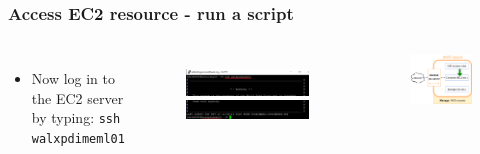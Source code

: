\documentclass[aspectratio=169]{beamer} %
\newcommand{\ectwoName}{walxpdimeml01}
\begin{document}
\begin{frame}
	\frametitle{Access EC2 resource - run a script}
	\begin{columns}[c]
		\begin{itemize}
			\item Now log in to the EC2 server by typing: \newline \texttt{ssh \ectwoName}
		\end{itemize}
		
		\begin{figure}
			\centering
			\includegraphics[width=\textwidth]{./img/access-3a.png}
			\includegraphics[width=\textwidth]{./img/access-3b.png}
		\end{figure}
		
		\begin{figure}
			\centering
			\includegraphics[width=\textwidth]{./img/wb-aws-ec2.png}
		\end{figure}
		
	\end{columns}
\end{frame}
\end{document}
